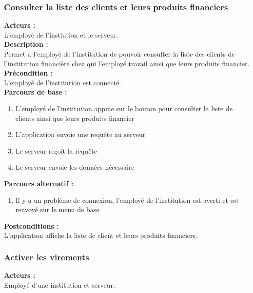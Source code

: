 \documentclass[../rapport.tex]{subfiles}
\begin{document}
\subsubsection{Consulter la liste des clients et leurs produits financiers}

\textbf{Acteurs :} \\
L'employé de l'instiution et le serveur. \\

\textbf{Description :} \\
Permet a  l’employé de l’institution de pouvoir consulter la liste des clients de l’institution financière chez qui l’employé travail ainsi que leurs produits financier. \\

\textbf{Précondition :} \\
L’employé de l’institution est connecté. \\

\textbf{Parcours de base :} \\
\begin{enumerate}
    \item L’employé de l’institution appuie sur le bouton pour consulter la liste de clients ainsi que leurs produits financier
    \item L’application envoie une requête au serveur 
    \item Le serveur reçoit la requête
    \item Le serveur envoie les données nécessaire
\end{enumerate}
\bigskip

\textbf{Parcours alternatif :}
\begin{enumerate}
    \item Il y a un problème de connexion, l'employé de l'institution est averti et est renvoyé sur le menu de base
\end{enumerate}

\textbf{Postconditions :} \\
L'application affiche la liste de client et leurs produits financiers. \\



\subsubsection{Activer les virements}

\textbf{Acteurs :} \\
Employé d'une institution et serveur. \\
\end{document}
